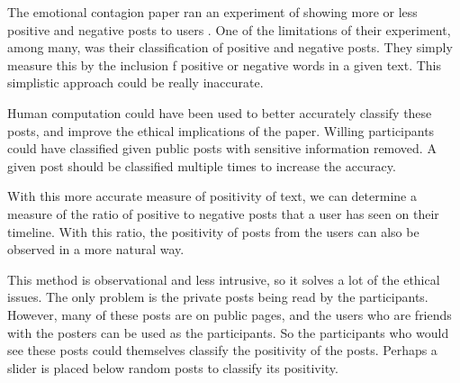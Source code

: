 \documentclass[../ass.tex]{subfiles}
\begin{document}
The emotional contagion paper ran an experiment of showing more or less positive and negative posts to users \cite{emot_cont}.
One of the limitations of their experiment, among many, was their classification of positive and negative posts. 
They simply measure this by the inclusion f positive or negative words in a given text.
This simplistic approach could be really inaccurate. 

Human computation could have been used to better accurately classify these posts, and improve the ethical implications of the paper. 
Willing participants could have classified given public posts with sensitive information removed. 
A given post should be classified multiple times to increase the accuracy.

With this more accurate measure of positivity of text, we can determine a measure of the ratio of positive to negative posts that a user has seen on their timeline. With this ratio, the positivity of posts from the users can also be observed in a more natural way. 

This method is observational and less intrusive, so it solves a lot of the ethical issues. The only problem is the private posts being read by the participants. However, many of these posts are on public pages, and the users who are friends with the posters can be used as the participants. So the participants who would see these posts could themselves classify the positivity of the posts. Perhaps a slider is placed below random posts to classify its positivity.

\end{document}
